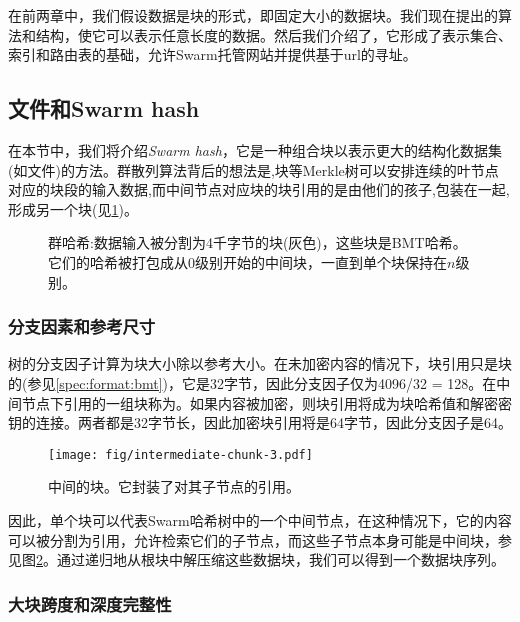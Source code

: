 \green{}

在前两章中，我们假设数据是块的形式，即固定大小的数据块。我们现在提出的算法和结构，使它可以表示任意长度的数据。然后我们介绍了，它形成了表示集合、索引和路由表的基础，允许Swarm托管网站并提供基于url的寻址。

\subsection{文件和Swarm hash\statusgreen}\label{sec:files}

在本节中，我们将介绍\emph{Swarm hash}，它是一种组合块以表示更大的结构化数据集(如文件)的方法。群散列算法背后的想法是,块等Merkle树可以安排连续的叶节点对应的块段的输入数据,而中间节点对应块的块引用的是由他们的孩子,包装在一起,形成另一个块(见\ref{fig:Swarm-hash})。 



\begin{figure}[htbp]
\centering
\resizebox{1\textwidth}{!}{
    
}
\caption[群散列\statusgreen]{群哈希:数据输入被分割为4千字节的块(灰色)，这些块是BMT哈希。它们的哈希被打包成从$0$级别开始的中间块，一直到单个块保持在$n$级别。 }
\label{fig:Swarm-hash}
\end{figure}

\subsubsection{分支因素和参考尺寸}

树的分支因子计算为块大小除以参考大小。在未加密内容的情况下，块引用只是块的(参见\ref{spec:format:bmt})，它是32字节，因此分支因子仅为4096/32 = 128。在中间节点下引用的一组块称为。如果内容被加密，则块引用将成为块哈希值和解密密钥的连接。两者都是32字节长，因此加密块引用将是64字节，因此分支因子是64。 


\begin{figure}[htbp]
\centering
\texttt{[image: fig/intermediate-chunk-3.pdf]}
\caption[中间块\statusgreen]{中间的块。它封装了对其子节点的引用。}
\label{fig:intermediate-chunk}
\end{figure}

因此，单个块可以代表Swarm哈希树中的一个中间节点，在这种情况下，它的内容可以被分割为引用，允许检索它们的子节点，而这些子节点本身可能是中间块，参见图\ref{fig:intermediate-chunk}。通过递归地从根块中解压缩这些数据块，我们可以得到一个数据块序列。 

 \subsubsection{大块跨度和深度完整性}

